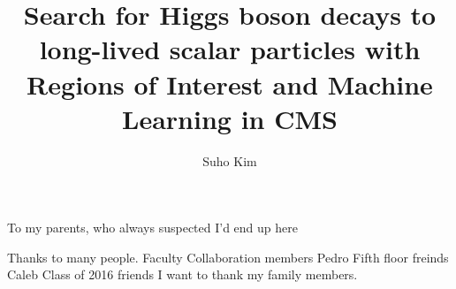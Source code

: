 \documentclass[11pt,expanded,copyright]{fsuthesis}
\title{Search for Higgs boson decays to long-lived scalar particles with Regions of Interest and Machine Learning in CMS}
\author{Suho Kim}  %
\begin{document}
\frontmatter          %
\maketitle            %
\makecommitteepage    %

\begin{dedication}
\centering
To my parents, who always suspected I'd end up here
\end{dedication}

\begin{acknowledgments}
Thanks to many people.
Faculty
Collaboration members 
Pedro
Fifth floor freinds
Caleb
Class of 2016 friends
I want to thank my family members.
\end{acknowledgments}
\end{document}
